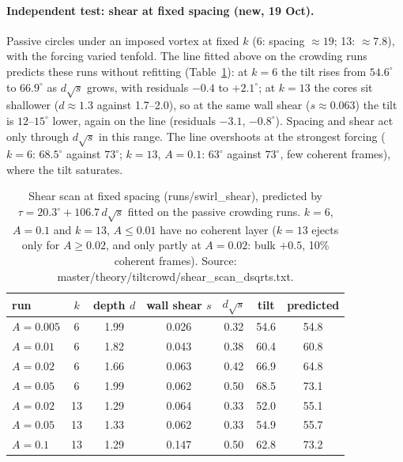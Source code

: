 \documentclass[11pt,a4paper]{article}
\begin{document}
\paragraph{Independent test: shear at fixed spacing (new, 19 Oct).} Passive circles under an imposed vortex at fixed $k$ (6: spacing $\approx19$; 13: $\approx7.8$), with the
forcing varied tenfold. The line fitted above on the crowding runs predicts these runs without refitting (Table~\ref{tab:shearscan}): at $k=6$ the tilt rises from
$54.6^\circ$ to $66.9^\circ$ as $d\sqrt{s}$ grows, with residuals $-0.4$ to $+2.1^\circ$; at $k=13$ the cores sit shallower ($d\approx1.3$ against 1.7--2.0), so at the
same wall shear ($s\approx0.063$) the tilt is $12$--$15^\circ$ lower, again on the line (residuals $-3.1$, $-0.8^\circ$). Spacing and shear act only through $d\sqrt{s}$ in this range.
The line overshoots at the strongest forcing ($k=6$: $68.5^\circ$ against $73^\circ$; $k=13$, $A=0.1$: $63^\circ$ against $73^\circ$, few coherent frames), where the tilt saturates.
\begin{table}[H]\centering\small
\begin{tabular}{lcccccc}\toprule
run & $k$ & depth $d$ & wall shear $s$ & $d\sqrt{s}$ & tilt & predicted \\\midrule
$A=0.005$ & 6 & 1.99 & 0.026 & 0.32 & 54.6 & 54.8\\
$A=0.01$ & 6 & 1.82 & 0.043 & 0.38 & 60.4 & 60.8\\
$A=0.02$ & 6 & 1.66 & 0.063 & 0.42 & 66.9 & 64.8\\
$A=0.05$ & 6 & 1.99 & 0.062 & 0.50 & 68.5 & 73.1\\
$A=0.02$ & 13 & 1.29 & 0.064 & 0.33 & 52.0 & 55.1\\
$A=0.05$ & 13 & 1.33 & 0.062 & 0.33 & 54.9 & 55.7\\
$A=0.1$ & 13 & 1.29 & 0.147 & 0.50 & 62.8 & 73.2\\\bottomrule
\end{tabular}
\caption{Shear scan at fixed spacing (runs/swirl\_shear), predicted by $\tau=20.3^\circ+106.7\,d\sqrt{s}$ fitted on the passive crowding runs. $k=6$, $A=0.1$ and $k=13$, $A\leq0.01$
have no coherent layer ($k=13$ ejects only for $A\geq0.02$, and only partly at $A=0.02$: bulk $+0.5$, 10\% coherent frames). Source: master/theory/tiltcrowd/shear\_scan\_dsqrts.txt.}\label{tab:shearscan}
\end{table}
\end{document}
